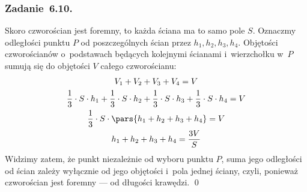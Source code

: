 \subsubsection*{Zadanie~6.10.}
Skoro czworościan jest foremny, to każda ściana ma to samo pole \(S\). Oznaczmy odległości punktu \(P\) od poszczególnych ścian przez \(h_1, h_2, h_3, h_4\). Objętości czworościanów o~podstawach będących kolejnymi ścianami i~wierzchołku w~\(P\) sumują się do objętości \(V\) całego czworościanu:
\begin{gather*}
    V_1 + V_2 + V_3 + V_4 = V\\
    \frac{1}{3} \cdot S \cdot h_1 + \frac{1}{3} \cdot S \cdot h_2 + \frac{1}{3} \cdot S \cdot h_3 + \frac{1}{3} \cdot S \cdot h_4 = V\\
    \frac{1}{3} \cdot S \cdot \pars{h_1 + h_2 + h_3 + h_4} = V\\
    h_1 + h_2 + h_3 + h_4 = \frac{3V}{S}
\end{gather*}
Widzimy zatem, że punkt niezależnie od wyboru punktu \(P\), suma jego odległości od ścian zależy wyłącznie od jego objętości i~pola jednej ściany, czyli, ponieważ czworościan jest foremny --- od długości krawędzi.
\qed
